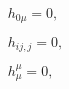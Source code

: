 \begin{equation}
\begin{array}{c}
h_{0\mu }=0, \\ 
\\ 
h_{ij,j}=0, \\ 
\\ 
h_{\mu }^{\mu }=0,
\end{array}
\label{30}
\end{equation}


